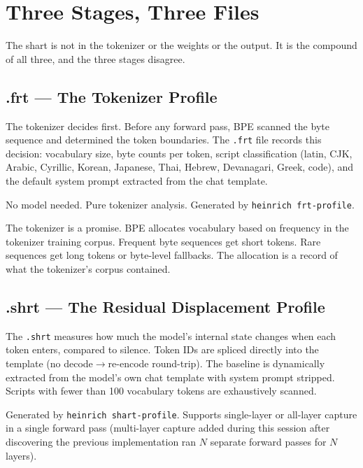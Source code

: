 \documentclass[11pt,a4paper]{article}
\begin{document}
\section{Three Stages, Three Files}

The shart is not in the tokenizer or the weights or the output. It is the compound of all three, and the three stages disagree.

\subsection{.frt --- The Tokenizer Profile}

The tokenizer decides first. Before any forward pass, BPE scanned the byte sequence and determined the token boundaries. The \texttt{.frt} file records this decision: vocabulary size, byte counts per token, script classification (latin, CJK, Arabic, Cyrillic, Korean, Japanese, Thai, Hebrew, Devanagari, Greek, code), and the default system prompt extracted from the chat template.

No model needed. Pure tokenizer analysis. Generated by \texttt{heinrich frt-profile}.

The tokenizer is a promise. BPE allocates vocabulary based on frequency in the tokenizer training corpus. Frequent byte sequences get short tokens. Rare sequences get long tokens or byte-level fallbacks. The allocation is a record of what the tokenizer's corpus contained.

\subsection{.shrt --- The Residual Displacement Profile}

The \texttt{.shrt} measures how much the model's internal state changes when each token enters, compared to silence. Token IDs are spliced directly into the template (no decode$\to$re-encode round-trip). The baseline is dynamically extracted from the model's own chat template with system prompt stripped. Scripts with fewer than 100 vocabulary tokens are exhaustively scanned.

Generated by \texttt{heinrich shart-profile}. Supports single-layer or all-layer capture in a single forward pass (multi-layer capture added during this session after discovering the previous implementation ran $N$ separate forward passes for $N$ layers).
\end{document}
